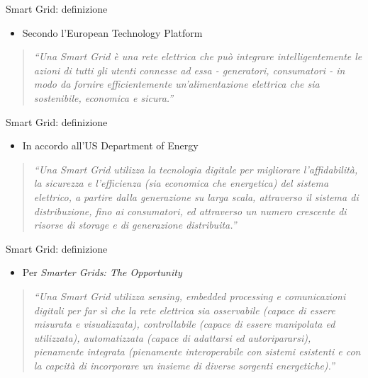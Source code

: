 \begin{frame}{Smart Grid: definizione}
\begin{itemize}
\item Secondo l’European Technology Platform
\end{itemize}
\begin{quote}
\textit{``Una Smart Grid è una rete elettrica che può integrare intelligentemente le azioni di tutti gli utenti connesse ad essa - generatori, consumatori - in modo da fornire efficientemente un’alimentazione elettrica che sia sostenibile, economica e sicura.”}
\end{quote}
\end{frame}

\begin{frame}{Smart Grid: definizione}
\begin{itemize}
\item In accordo all’US Department of Energy
\end{itemize}
\begin{quote}
\textit{``Una Smart Grid utilizza la tecnologia digitale per migliorare l’affidabilità, la sicurezza e l’efficienza (sia economica che energetica) del sistema elettrico, a partire dalla generazione su larga scala, attraverso il sistema di distribuzione, fino ai consumatori, ed attraverso un numero crescente di risorse di storage e di generazione distribuita.”}
\end{quote}
\end{frame}


\begin{frame}{Smart Grid: definizione}
\begin{itemize}
\item Per \textit{Smarter Grids: The Opportunity}
\end{itemize}
\begin{quote}
\textit{``Una Smart Grid utilizza sensing, embedded processing e comunicazioni digitali per far sì che la rete elettrica sia osservabile (capace di essere misurata e visualizzata), controllabile (capace di essere manipolata ed utilizzata), automatizzata (capace di adattarsi ed autoripararsi), pienamente integrata (pienamente interoperabile con sistemi esistenti e con la capcità di incorporare un insieme di diverse sorgenti energetiche).”}
\end{quote}
\end{frame}

